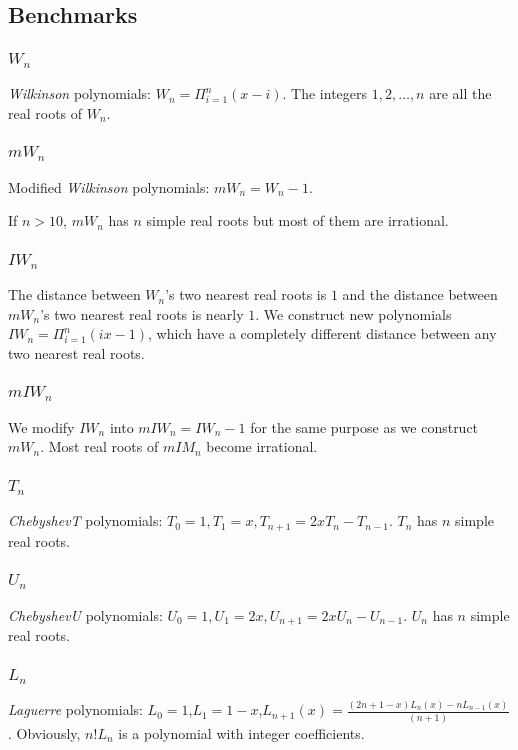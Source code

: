\documentclass[10pt,a4paper]{article}
\begin{document}
\subsection{Benchmarks }
 \subsubsection{$W_n$}
 {\it Wilkinson} polynomials: $W_n=\Pi_{i=1}^n(x-i)$. The integers $1,2,\ldots,n $ are  all the real roots of $W_n$.
  \subsubsection{$mW_n$}
  Modified {\it Wilkinson} polynomials: $mW_n=W_n-1$.

  If $n>10$, $mW_n$ has $n$ simple real roots but most of them are irrational.
 \subsubsection{$IW_n$}
 The distance between  $W_n$'s two  nearest real roots  is  $1$ and the distance between $mW_n$'s two nearest real roots  is nearly $1$. %
 We construct new polynomials $IW_n=\Pi_{i=1}^n(ix-1)$, which have a completely different distance between any two nearest real roots.
 \subsubsection{$ mIW_n$ }
 We modify $IW_n$  into $mIW_n=IW_n-1$ for the same purpose  as we construct $mW_n$. Most real roots of $mIM_n$  become irrational.
 \subsubsection{$T_n$} {\it ChebyshevT} polynomials: $T_0=1,T_1=x,T_{n+1}=2xT_n-T_{n-1}$. $T_n$ has $n$ simple real roots.
 \subsubsection{$U_n$} {\it ChebyshevU} polynomials: $U_0=1,U_1=2x,U_{n+1}=2xU_n-U_{n-1}$. $U_n$ has $n$ simple real roots.
 \subsubsection{$L_n$}
 {\it Laguerre}  polynomials: $L_0=1$,$L_1=1-x$,$L_{n+1}(x)=\frac{  (2n+1-x )L_n(x)-  nL_{n-1 }(x)}{(n+1) }$. %
Obviously, $n!L_n$ is a polynomial with integer coefficients.
\end{document}
